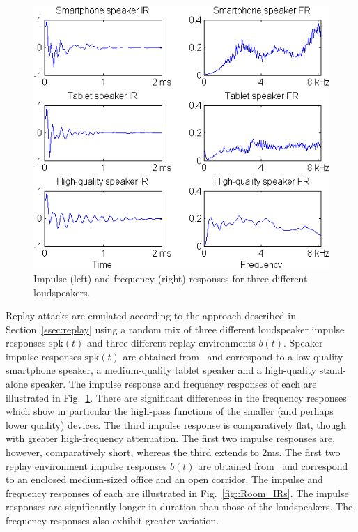 
\begin{figure}
	\centering
	\includegraphics[width=1\linewidth]{Figs/IRs.png}
	\caption{Impulse (left) and frequency (right) responses for three different loudspeakers.}
	\label{fig::IRs}
\end{figure}

Replay attacks are emulated according to the approach described in Section~\ref{ssec:replay} 
using a random mix of three different loudspeaker impulse responses $\mathrm{spk}(t)$ and three different replay environments $b(t)$.  
Speaker impulse responses $\mathrm{spk}(t)$ are obtained from~\cite{Brown2014} and correspond to a low-quality smartphone speaker, a medium-quality tablet speaker and a high-quality stand-alone speaker.  The impulse response and frequency responses of each are illustrated in Fig.~\ref{fig::IRs}.  There are significant differences in the frequency responses which show in particular the high-pass functions of the smaller (and perhaps lower quality) devices.  The third impulse response is comparatively flat, though with greater high-frequency attenuation.  The first two impulse responses are, however, comparatively short, whereas the third extends to 2ms.  The first two replay environment impulse responses $b(t)$ are obtained from~\cite{Jeub2009} and correspond to an enclosed medium-sized office and an open corridor. The impulse and frequency responses of each are illustrated in Fig.~\ref{fig::Room_IRs}.  The impulse responses are significantly longer in duration than those of the loudspeakers.  The frequency responses also exhibit greater variation.  

